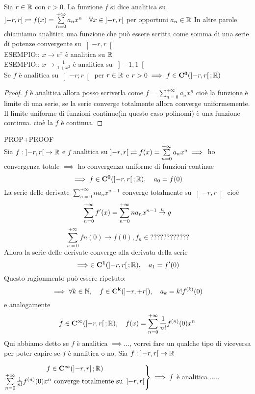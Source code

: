 Sia $r\in \mathbb{R}$ con $r>0$. La funzione $f$ si dice analitica su $\left]-r,r\right[ \rightleftharpoons f(x)=\sum\limits_{n=0}^{+\infty}a_nx^n \quad \forall x\in\left]-r,r\right[$ per opportuni $a_n\in \mathbb{R}$
\observation
In altre parole chiamiamo analitica una funzione che può essere scritta come somma di una serie di potenze convergente su $\left]-r,r\right[$ \\
ESEMPIO:: $x\to e^x$ è analitica su $ \mathbb{R}$\\
ESEMPIO:: $x\to\frac{1}{1+x^2}$ è analitica su $\left]-1,1\right[$\\
\proposition
Se $f$ è analitica su $\left]-r;r\right[$ per $r\in \mathbb{R}$ e $r>0 \implies f\in \mathbf{C^{0}}(\left]-r,r\right[; \mathbb{R})$
\begin{proof}
	$f$ è analitica  allora posso scriverla come $f=\sum\limits_{n=0}^{+\infty}a_nx^n$ cioè la funzione è limite di una serie, se la serie converge totalmente allora converge uniformemente. Il limite uniforme di funzioni continue(in questo caso polinomi) è una funzione continua. cioè la $f$ è continua.
\end{proof}
\proposition PROP+PROOF\\
Sia $f:\left]-r,r\right[\to \mathbb{R}$ e $f$ analitica su $\left]-r,r\right[ \rightleftharpoons f(x)=\sum\limits_{n=0}^{+\infty}a_nx^n \implies$ ho convergenza totale $\implies$ ho convergenza uniforme di funzioni continue
\[\implies f\in \mathbf{C^{0}}(\left]-r,r\right[; \mathbb{R}),\quad a_0=f(0)\]
La serie delle derivate $\sum\limits_{n=0}^{+\infty}na_nx^{n-1}$ converge totalmente su $\left]-r,r\right[$ cioè
\[\sum\limits_{n=0}^{+\infty}f'(x)=\sum\limits_{n=0}^{+\infty}na_nx^{n-1} \overset{\text{u}}{\to} g\]
\[\sum\limits_{n=0}^{+\infty}fn(0)\to f(0), f_n\in ????????????\]
Allora la serie delle derivate converge alla derivata della serie
\[\implies \in \mathbf{C^{1}}(\left]-r,r\right[; \mathbb{R}),\quad a_1=f'(0)\]
Questo ragionmento può essere ripetuto:
\[\implies \forall k\in\mathbb{N},\quad f\in \mathbf{C^{k}}(\left]-r,+r\right[),\quad a_k=k!f^{(k)}(0)\]
e analogamente
\[f\in \mathbf{C^{\infty}}(\left]-r,r\right[; \mathbb{R}),\quad f(x)=\sum\limits_{n=0}^{+\infty}\frac{1}{n!}f^{(n)}(0)x^n\]
\observation Qui abbiamo detto se $f$ è analitica $\implies \ldots$, vorrei fare un qualche tipo di viceversa per poter capire se $f$ è analitica o no.
\proposition
Sia $f:\left]-r,r\right[\to \mathbb{R}$
\begin{center}
	$\left.\begin{matrix}
	f\in \mathbf{C^{\infty}}(\left]-r,r\right[; \mathbb{R})\\
	\sum\limits_{n=0}^{+\infty}\frac{1}{n!}f^{(n)}(0)x^n\text{ converge totalmente su } \left]-r,r\right[\\
	\end{matrix}\right\}\implies f$ è analitica  .....
\end{center}
